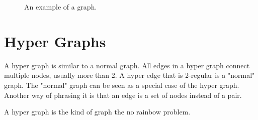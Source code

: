 \documentclass[msc,lith,english]{liuthesis}
\begin{document}
\begin{center}
\begin{figure}[h]
\centering
{}
  \caption{An example of a graph.}
  \label{figGraphExample}
\end{figure}
\end{center}


\section{Hyper Graphs}
A hyper graph is similar to a normal graph.
All edges in a hyper graph connect multiple nodes, usually more than 2.
A hyper edge that is 2-regular is a "normal" graph.
The "normal" graph can be seen as a special case of the hyper graph.
Another way of phrasing it is that an edge is a set of nodes instead of a pair.

A hyper graph is the kind of graph the no rainbow problem.
\end{document}
